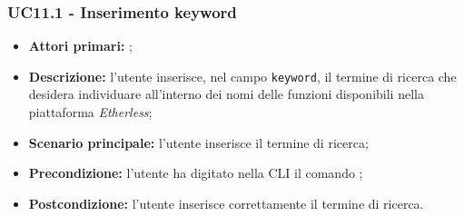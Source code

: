 \subsubsection{UC11.1 - Inserimento keyword}
\begin{itemize}
	\item \textbf{Attori primari:} \ua{};
	\item \textbf{Descrizione:} l’utente inserisce, nel campo \texttt{keyword}, il termine di ricerca che desidera individuare all’interno dei nomi delle funzioni disponibili nella piattaforma \textit{Etherless}; 
	\item \textbf{Scenario principale:} l'utente inserisce il termine di ricerca;
	\item \textbf{Precondizione:} l’utente ha digitato nella CLI il comando \search{};
	\item \textbf{Postcondizione:} l’utente inserisce correttamente il termine di ricerca. 
\end{itemize}